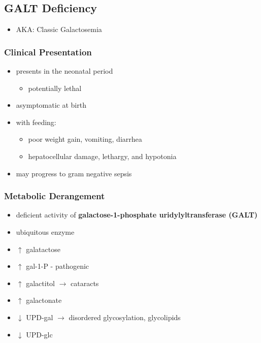 \documentclass[12pt]{scrartcl}
\begin{document}
\subsection{GALT Deficiency}
\label{sec:orgeebf5fd}
\begin{itemize}
\item AKA: Classic Galactosemia
\end{itemize}
\subsubsection{Clinical Presentation}
\label{sec:orge1b5c04}
\begin{itemize}
\item presents in the neonatal period
\begin{itemize}
\item potentially lethal
\end{itemize}
\item asymptomatic at birth
\item with feeding:
\begin{itemize}
\item poor weight gain, vomiting, diarrhea
\item hepatocellular damage, lethargy, and hypotonia
\end{itemize}
\item may progress to gram negative sepsis
\end{itemize}

\subsubsection{Metabolic Derangement}
\label{sec:org9f88d55}
\begin{itemize}
\item deficient activity of \textbf{galactose-1-phosphate uridylyltransferase (GALT)}
\end{itemize}


\begin{itemize}
\item ubiquitous enzyme
\item \(\uparrow\)  galatactose
\item \(\uparrow\) gal-1-P - pathogenic
\item \(\uparrow\) galactitol \(\to\) cataracts
\item \(\uparrow\) galactonate
\item \(\downarrow\) UPD-gal \(\to\) disordered glycosylation, glycolipids
\item \(\downarrow\) UPD-glc
\end{itemize}
\end{document}
